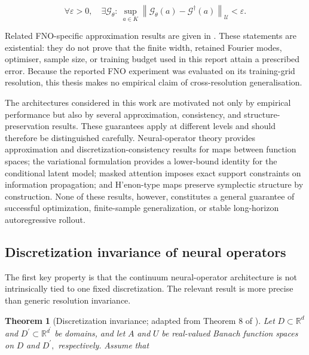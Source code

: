 \begin{equation}
\label{eq:230}
\forall\varepsilon>0,\quad\exists\mathcal G_{\theta}:\ \sup_{a\in K}\left\|\mathcal G_{\theta}(a)-\mathcal G^{\dagger}(a)\right\|_{\mathcal U}<\varepsilon.
\end{equation}

Related FNO-specific approximation results are given in \cite{kovachki2021fno}. These statements are existential: they do not prove that the finite width, retained Fourier modes, optimiser, sample size, or training budget used in this report attain a prescribed error. Because the reported FNO experiment was evaluated on its training-grid resolution, this thesis makes no empirical claim of cross-resolution generalisation.

The architectures considered in this work are motivated not only by empirical performance but also by several approximation, consistency, and structure-preservation results. These guarantees apply at different levels and should therefore be distinguished carefully. Neural-operator theory provides approximation and discretization-consistency results for maps between function spaces; the variational formulation provides a lower-bound identity for the conditional latent model; masked attention imposes exact support constraints on information propagation; and H’enon-type maps preserve symplectic structure by construction. None of these results, however, constitutes a general guarantee of successful optimization, finite-sample generalization, or stable long-horizon autoregressive rollout.

\subsection{Discretization invariance of neural operators}
\label{sec:auxiliary_theoretical_results_discretization_invariance_of_neural_operators}

The first key property is that the continuum neural-operator architecture is not intrinsically tied to one fixed discretization. The relevant result is more precise than generic resolution invariance.

\textbf{Theorem} \textbf{1} (Discretization invariance; adapted from Theorem 8 of \cite{kovachki2023operators}). \emph{Let} \(D \subset \mathbb{R}^{d}\) \emph{and} \(D^{'} \subset \mathbb{R}^{d^{'}}\) \emph{be} \emph{domains,} \emph{and} \emph{let} \(A\) \emph{and} \(U\) \emph{be} \emph{real-valued} \emph{Banach} \emph{function} \emph{spaces} \emph{on} \(D\) \emph{and} \(D^{'} ,\) \emph{respectively.} \emph{Assume} \emph{that}

